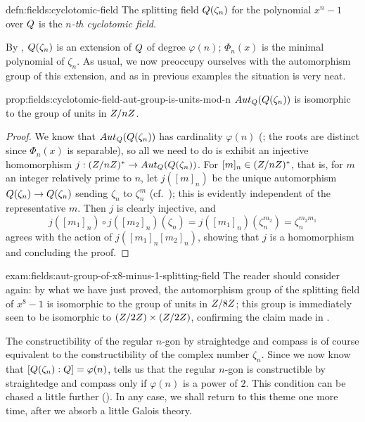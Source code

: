 \begin{defn}{}{defn:fields:cyclotomic-field}
  The splitting field $Q(\zeta_n)$ for the polynomial $x^n - 1$ over
  $Q$ is the \emph{$n$-th cyclotomic field}.
\end{defn}
By , $Q(\zeta_n)$ is an extension of $Q$ of
degree $\varphi(n)$; $\Phi_n(x)$ is the minimal polynomial of
$\zeta_n$.  As usual, we now preoccupy ourselves with the automorphism
group of this extension, and as in previous examples the situation is
very neat.
\begin{prop}{}{prop:fields:cyclotomic-field-aut-group-is-units-mod-n}
  $Aut_{Q}(Q(\zeta_n))$ is isomorphic to the group of units in
  $Z/nZ$.
\end{prop}
\begin{proof}
  We know that $Aut_{Q}(Q(\zeta_n))$ has cardinality $\varphi(n)$
  (; the roots are distinct since $\Phi_n(x)$ is
  separable), so all we need to do is exhibit an injective
  homomorphism $j : (Z/nZ)^* \to Aut_{Q}(Q(\zeta_n))$. For
  $[m]_n \in (Z/nZ)^*$, that is, for $m$ an integer relatively prime
  to $n$, let $j([m]_n)$ be the unique automorphism
  $Q(\zeta_n) \to Q(\zeta_n)$ sending $\zeta_n$ to $\zeta_n^m$ (cf.\
  ); this is evidently independent of the
  representative $m$. Then $j$ is clearly injective, and
  \[
    j([m_1]_n) \circ j([m_2]_n)(\zeta_n) = j([m_1]_n)(\zeta_n^{m_2}) =
    \zeta_n^{m_2 m_1}
  \]
  agrees with the action of $j([m_1]_n [m_2]_n)$, showing that $j$ is
  a homomorphism and concluding the proof.
\end{proof}
\begin{exam}{}{exam:fields:aut-group-of-x8-minus-1-splitting-field}
  The reader should consider  again: by
  what we have just proved, the automorphism group of the splitting
  field of $x^8 - 1$ is isomorphic to the group of units in $Z/8Z$;
  this group is immediately seen to be isomorphic to
  $(Z/2Z) \times (Z/2Z)$, confirming the claim made in
  .
\end{exam}
The constructibility of the regular $n$-gon by straightedge and
compass is of course equivalent to the constructibility of the complex
number $\zeta_n$. Since we now know that
$[Q(\zeta_n) : Q] = \varphi(n)$,  tells us
that the regular $n$-gon is constructible by straightedge and compass
only if $\varphi(n)$ is a power of $2$. This condition can be chased a
little further
(). In
any case, we shall return to this theme one more time, after we absorb
a little Galois theory.

